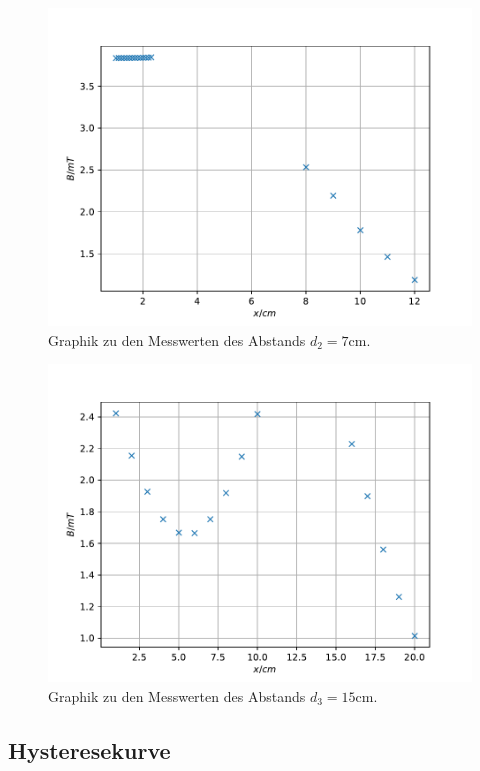 \begin{figure}
\centering
\includegraphics{content/data/plot_helmholtz2.pdf}
\caption{Graphik zu den Messwerten des Abstands  $d_2=7\si{\centi\metre}$.}
\label{fig:helm2}
\end{figure}

\begin{figure}
\centering
\includegraphics{content/data/plot_helmholtz3.pdf}
\caption{Graphik zu den Messwerten des Abstands $d_3=15\si{\centi\metre}$.}
\label{fig:helm3}
\end{figure}

\FloatBarrier
\subsection{Hysteresekurve}

